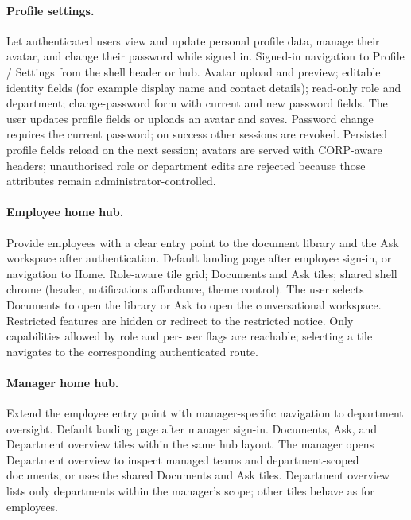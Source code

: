 \paragraph{Profile settings.}
\uiexplain
{Let authenticated users view and update personal profile data, manage their
avatar, and change their password while signed in.}
{Signed-in navigation to Profile / Settings from the shell header or hub.}
{Avatar upload and preview; editable identity fields (for example display name
and contact details); read-only role and department; change-password form with
current and new password fields.}
{The user updates profile fields or uploads an avatar and saves. Password change
requires the current password; on success other sessions are revoked.}
{Persisted profile fields reload on the next session; avatars are served with
CORP-aware headers; unauthorised role or department edits are rejected because
those attributes remain administrator-controlled.}

\paragraph{Employee home hub.}
\uiexplain
{Provide employees with a clear entry point to the document library and the Ask
workspace after authentication.}
{Default landing page after employee sign-in, or navigation to Home.}
{Role-aware tile grid; Documents and Ask tiles; shared shell chrome (header,
notifications affordance, theme control).}
{The user selects Documents to open the library or Ask to open the conversational
workspace. Restricted features are hidden or redirect to the restricted notice.}
{Only capabilities allowed by role and per-user flags are reachable; selecting a
tile navigates to the corresponding authenticated route.}

\paragraph{Manager home hub.}
\uiexplain
{Extend the employee entry point with manager-specific navigation to department
oversight.}
{Default landing page after manager sign-in.}
{Documents, Ask, and Department overview tiles within the same hub layout.}
{The manager opens Department overview to inspect managed teams and
department-scoped documents, or uses the shared Documents and Ask tiles.}
{Department overview lists only departments within the manager's scope; other
tiles behave as for employees.}

